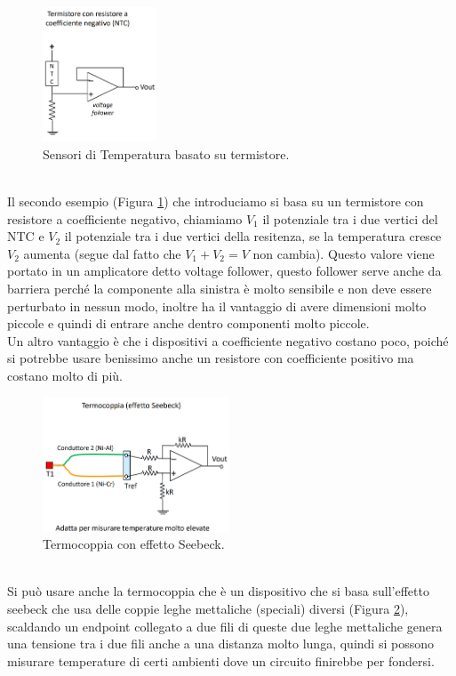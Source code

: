 \documentclass[11pt, twocolumn]{article}
\begin{document}
\begin{figure}[!h]
  \centering
  \includegraphics[width=\linewidth,height=4cm]{imgs/thermistor.png}
  \caption{Sensori di Temperatura basato su termistore.}
  \label{fig:thermistor}
\end{figure}\\
Il secondo esempio (Figura \ref{fig:thermistor}) che introduciamo si basa su un termistore con resistore a coefficiente negativo, chiamiamo $V_1$ il potenziale tra i due vertici del NTC e $V_2$ il potenziale tra i due vertici della resitenza, se la temperatura cresce $V_2$ aumenta (segue dal fatto che $V_1+V_2 = V$ non cambia).
Questo valore viene portato in un amplicatore detto voltage follower, questo follower serve anche da barriera perché la componente alla sinistra è molto sensibile e non deve essere perturbato in nessun modo, inoltre ha il vantaggio di avere dimensioni molto piccole e quindi di entrare anche dentro componenti molto piccole.\\
Un altro vantaggio è che i dispositivi a coefficiente negativo costano poco, poiché si potrebbe usare benissimo anche un resistore con coefficiente positivo ma costano molto di più.
\begin{figure}[!h]
  \centering
  \includegraphics[width=\linewidth,height=4cm]{imgs/termocoppia.png}
  \caption{Termocoppia con effetto Seebeck.}
  \label{fig:termocoppia}
\end{figure}\\
Si può usare anche la termocoppia che è un dispositivo che si basa sull'effetto seebeck che usa delle coppie leghe mettaliche (speciali) diversi (Figura \ref{fig:termocoppia}), scaldando un endpoint collegato a due fili di queste due leghe mettaliche genera una tensione tra i due fili anche a una distanza molto lunga, quindi si possono misurare temperature di certi ambienti dove un circuito finirebbe per fondersi.
\end{document}
